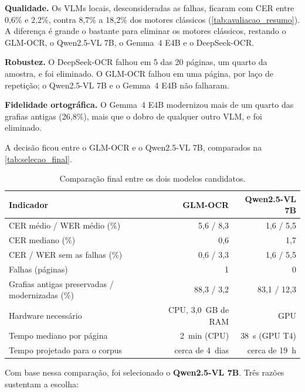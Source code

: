 \documentclass[noabntexcite,oneside]{ufsc-thesis-rn46-2019}
\begin{document}
\textbf{Qualidade.} Os VLMs locais, desconsideradas as falhas, ficaram com CER entre 0,6\%
e 2,2\%, contra 8,7\% a 18,2\% dos motores clássicos (\autoref{tab:avaliacao_resumo}).
A diferença é grande o bastante para eliminar os motores clássicos, restando o GLM-OCR, o
Qwen2.5-VL 7B, o Gemma~4 E4B e o DeepSeek-OCR.

\textbf{Robustez.} O DeepSeek-OCR falhou em 5 das 20 páginas, um quarto da amostra, e foi
eliminado. O GLM-OCR falhou em uma página, por laço de repetição; o Qwen2.5-VL 7B e o
Gemma~4 E4B não falharam.

\textbf{Fidelidade ortográfica.} O Gemma~4 E4B modernizou mais de um quarto das grafias
antigas (26,8\%), mais que o dobro de qualquer outro VLM, e foi eliminado.

A decisão ficou entre o GLM-OCR e o Qwen2.5-VL 7B, comparados na
\autoref{tab:selecao_final}.

\begin{table}[htb]
\centering
\caption{Comparação final entre os dois modelos candidatos.}
\label{tab:selecao_final}
\renewcommand{\arraystretch}{1.3}
{\small
\begin{tabular}{L{6.2cm} r r}
\hline
\textbf{Indicador} & \textbf{GLM-OCR} & \textbf{Qwen2.5-VL 7B} \\
\hline
CER médio / WER médio (\%) & 5,6 / 8,3 & 1,6 / 5,5 \\
CER mediano (\%) & 0,6 & 1,7 \\
CER / WER sem as falhas (\%) & 0,6 / 3,3 & 1,6 / 5,5 \\
Falhas (páginas) & 1 & 0 \\
Grafias antigas preservadas / modernizadas (\%) & 88,3 / 3,2 & 83,1 / 12,3 \\
Hardware necessário & CPU, 3,0~GB de RAM & GPU \\
Tempo mediano por página & 2~min (CPU) & 38~s (GPU T4) \\
Tempo projetado para o corpus & cerca de 4~dias & cerca de 19~h \\
\hline
\end{tabular}
}
\end{table}

Com base nessa comparação, foi selecionado o \textbf{Qwen2.5-VL 7B}. Três razões
sustentam a escolha:
\end{document}
